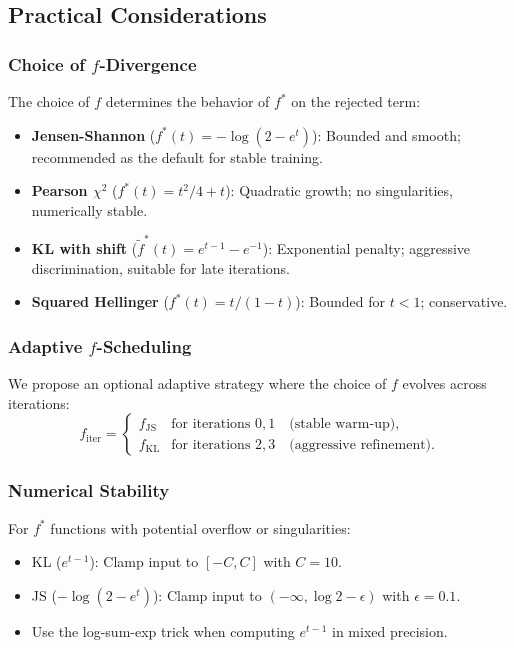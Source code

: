 \documentclass[11pt,a4paper]{article}
\begin{document}
\subsection{Practical Considerations}
\label{subsec:practical}

\subsubsection{Choice of $f$-Divergence}

The choice of $f$ determines the behavior of $f^*$ on the rejected term:
\begin{itemize}[nosep]
    \item \textbf{Jensen-Shannon} ($f^*(t) = -\log(2 - e^t)$): Bounded and smooth; recommended as the default for stable training.
    \item \textbf{Pearson $\chi^2$} ($f^*(t) = t^2/4 + t$): Quadratic growth; no singularities, numerically stable.
    \item \textbf{KL with shift} ($\tilde{f}^*(t) = e^{t-1} - e^{-1}$): Exponential penalty; aggressive discrimination, suitable for late iterations.
    \item \textbf{Squared Hellinger} ($f^*(t) = t/(1-t)$): Bounded for $t < 1$; conservative.
\end{itemize}

\subsubsection{Adaptive $f$-Scheduling}

We propose an optional adaptive strategy where the choice of $f$ evolves across iterations:
\begin{equation}
    f_{\mathrm{iter}} =
    \begin{cases}
        f_{\mathrm{JS}} & \text{for iterations } 0, 1 \quad \text{(stable warm-up)}, \\
        f_{\mathrm{KL}} & \text{for iterations } 2, 3 \quad \text{(aggressive refinement)}.
    \end{cases}
    \label{eq:scheduling}
\end{equation}

\subsubsection{Numerical Stability}

For $f^*$ functions with potential overflow or singularities:
\begin{itemize}[nosep]
    \item KL ($e^{t-1}$): Clamp input to $[-C, C]$ with $C = 10$.
    \item JS ($-\log(2 - e^t)$): Clamp input to $(-\infty, \log 2 - \epsilon)$ with $\epsilon = 0.1$.
    \item Use the log-sum-exp trick when computing $e^{t-1}$ in mixed precision.
\end{itemize}
\end{document}
